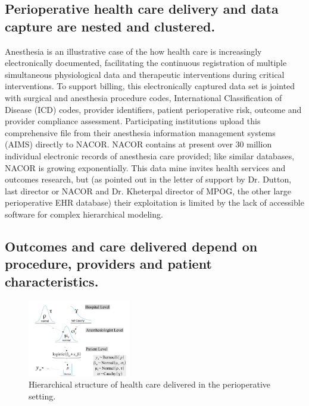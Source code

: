 \documentclass[11pt,notitlepage]{article}
\begin{document}
\subsection*{Perioperative health care delivery and data capture are nested and clustered.}
Anesthesia is an illustrative case of the how health care is increasingly 
electronically documented, facilitating the continuous registration of 
multiple simultaneous physiological data and therapeutic interventions during 
critical interventions. To support billing, this electronically captured data 
set is jointed with surgical and anesthesia procedure codes, International 
Classification of Disease (ICD) codes, provider identifiers, patient perioperative 
risk, outcome and provider compliance assessment. Participating institutions upload 
this comprehensive file from their anesthesia information management systems 
(AIMS) directly to NACOR. NACOR contains at present over 30 million individual 
electronic records of anesthesia care provided; like similar databases, NACOR is 
growing exponentially. This data mine invites health services and outcomes research, 
but (as pointed out in the letter of support by Dr. Dutton, last director or 
NACOR and Dr. Kheterpal director of MPOG, the other large perioperative EHR 
database) their exploitation is limited by the lack of accessible software 
for complex hierarchical modeling.

\subsection*{Outcomes and care delivered depend on procedure, providers and patient characteristics.} 

\begin{figure} 
\includegraphics[width=0.4\textwidth]{Figures/DistrogramNACOR.pdf} 
\caption{Hierarchical structure of health care delivered in the perioperative setting.}
\label{fig:NACOR}
\end{figure}
\end{document}
